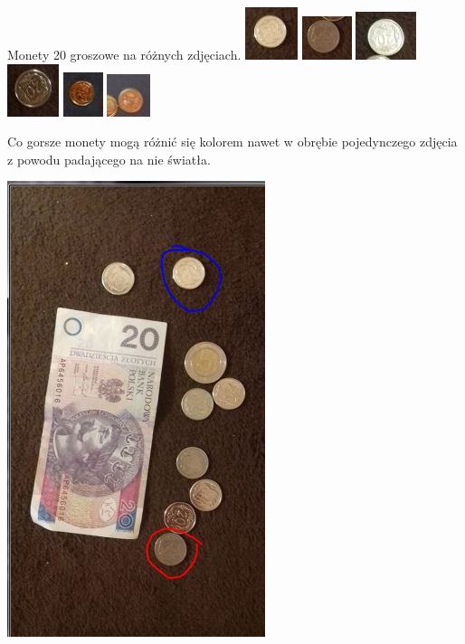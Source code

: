 \documentclass[12pt]{article}
\begin{document}
Monety 20 groszowe na różnych zdjęciach.
\includegraphics[scale=1]{20gr1}
\includegraphics[scale=1]{20gr2}
\includegraphics[scale=1]{20gr3}
\includegraphics[scale=1]{20gr4}
\includegraphics[scale=1]{20gr5}
\includegraphics[scale=1]{20gr6}

\newpage
Co gorsze monety mogą różnić się kolorem nawet w obrębie pojedynczego zdjęcia z powodu padającego na nie światła.

\includegraphics[scale=0.8]{20gr_rozne}
\end{document}

